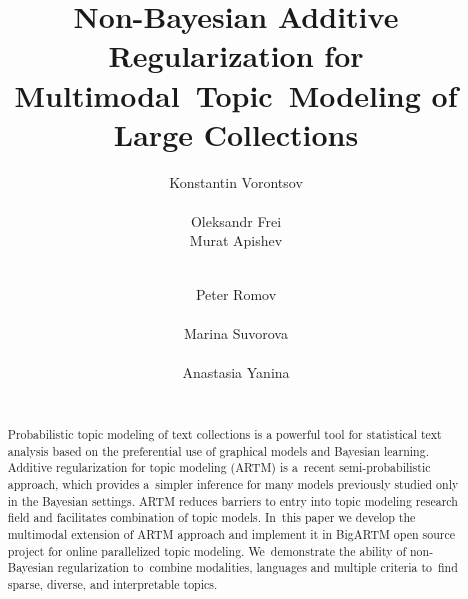 \documentclass{sig-alternate-2013}
\begin{document}
\title{
    Non-Bayesian Additive Regularization for Multimodal~Topic~Modeling of Large Collections
}
\author{
    \alignauthor
        Konstantin Vorontsov\\
        \\
    \alignauthor
        Oleksandr Frei\\
    \alignauthor
        Murat Apishev\\
        \\
    \and
    \alignauthor
        Peter Romov\\
        \\
    \alignauthor
        Marina Suvorova\\
        \\
    \alignauthor
        Anastasia Yanina\\
        \\
}
\maketitle

\begin{abstract}
Probabilistic topic modeling of text collections is a powerful tool for statistical text analysis
based on the preferential use of graphical models and Bayesian learning.
Additive regularization for topic modeling (ARTM) is a~recent semi-probabilistic approach, which
provides a~simpler inference for many models previously studied only in the Bayesian settings.
ARTM reduces barriers to entry into topic modeling research field
and facilitates combination of topic models.
In~this paper we develop the multimodal extension of ARTM approach
and implement it in \mbox{BigARTM} open source project %
for online parallelized topic modeling.
We~demonstrate the ability of non-Bayesian regularization
to~combine modalities, languages and multiple criteria
to~find sparse, diverse, and interpretable topics.
\end{abstract}
\end{document}
